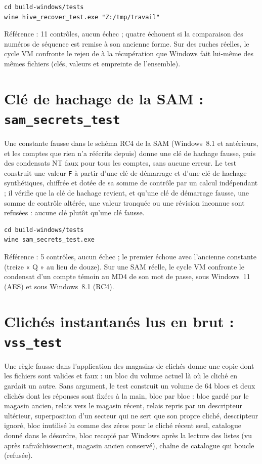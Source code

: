 \documentclass[11pt,a4paper,oneside]{report}
\begin{document}
\begin{lstlisting}
cd build-windows/tests
wine hive_recover_test.exe "Z:/tmp/travail"
\end{lstlisting}

Référence : 11 contrôles, aucun échec ; quatre échouent si la comparaison des
numéros de séquence est remise à son ancienne forme. Sur des ruches réelles,
le cycle VM confronte le rejeu de \wac{} à la récupération que Windows fait
lui-même des mêmes fichiers (clés, valeurs et empreinte de l'ensemble).

\section{Clé de hachage de la SAM : \texttt{sam\_secrets\_test}}

Une constante fausse dans le schéma RC4 de la SAM (Windows~8.1 et antérieurs,
et les comptes que rien n'a réécrits depuis) donne une clé de hachage fausse,
puis des condensats NT faux pour tous les comptes, sans aucune erreur. Le test
construit une valeur \texttt{F} à partir d'une clé de démarrage et d'une clé de
hachage synthétiques, chiffrée et dotée de sa somme de contrôle par un calcul
indépendant ; il vérifie que la clé de hachage revient, et qu'une clé de
démarrage fausse, une somme de contrôle altérée, une valeur tronquée ou une
révision inconnue sont refusées : aucune clé plutôt qu'une clé fausse.

\begin{lstlisting}
cd build-windows/tests
wine sam_secrets_test.exe
\end{lstlisting}

Référence : 5 contrôles, aucun échec ; le premier échoue avec l'ancienne
constante (treize « Q » au lieu de douze). Sur une SAM réelle, le cycle VM
confronte le condensat d'un compte témoin au MD4 de son mot de passe, sous
Windows~11 (AES) et sous Windows~8.1 (RC4).

\section{Clichés instantanés lus en brut : \texttt{vss\_test}}

Une règle fausse dans l'application des magasins de clichés donne une copie
dont les fichiers sont valides et faux : un bloc du volume actuel là où le
cliché en gardait un autre. Sans argument, le test construit un volume de 64
blocs et deux clichés dont les réponses sont fixées à la main, bloc par bloc :
bloc gardé par le magasin ancien, relais vers le magasin récent, relais repris
par un descripteur ultérieur, superposition d'un secteur qui ne sert que son
propre cliché, descripteur ignoré, bloc inutilisé lu comme des zéros pour le
cliché récent seul, catalogue donné dans le désordre, bloc recopié par Windows
après la lecture des listes (vu après rafraîchissement, magasin ancien
conservé), chaîne de catalogue qui boucle (refusée).
\end{document}
